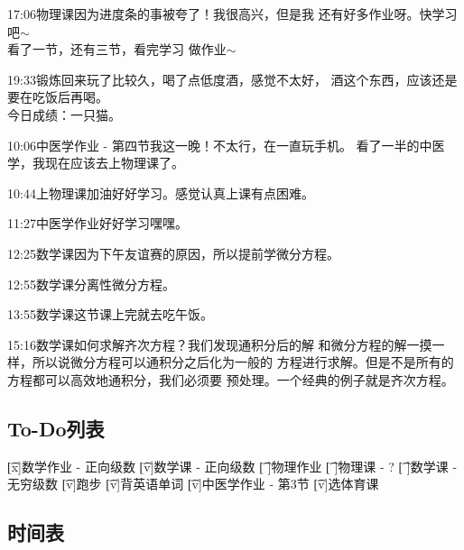 \documentclass{peterlitsdoc}
\begin{document}
\begin{pltplan}
\item[v]{17:06}{物理课}{因为进度条的事被夸了！我很高兴，但是我
    还有好多作业呀。快学习吧$\sim$\\看了一节，还有三节，看完学习
    做作业$\sim$}
\item[v]{19:33}{锻炼}{回来玩了比较久，喝了点低度酒，感觉不太好，
    酒这个东西，应该还是要在吃饭后再喝。\\今日成绩：一只猫。}
\item[x]{10:06}{中医学作业 - 第四节}{我这一晚！不太行，在一直玩手机。
    看了一半的中医学，我现在应该去上物理课了。}
\item[x]{10:44}{上物理课}{加油好好学习。感觉认真上课有点困难。}
\item[v]{11:27}{中医学作业}{好好学习嘿嘿。}
\item[x]{12:25}{数学课}{因为下午友谊赛的原因，所以提前学微分方程。}
\item[x]{12:55}{数学课}{分离性微分方程。}
\item[x]{13:55}{数学课}{这节课上完就去吃午饭。}
\item[x]{15:16}{数学课}{如何求解齐次方程？我们发现通积分后的解
    和微分方程的解一摸一样，所以说微分方程可以通积分之后化为一般的
    方程进行求解。但是不是所有的方程都可以高效地通积分，我们必须要
    预处理。一个经典的例子就是齐次方程。}
\end{pltplan}

\newpage



\subsection{To-Do列表}

\begin{plttodoenv}{4}
    \t[x]数学作业 - 正向级数
    \t[v]数学课 - 正向级数
    \t[ ]物理作业
    \t[ ]物理课 - ?
    \t[ ]数学课 - 无穷级数
    \t[v]跑步
    \t[v]背英语单词
    \t[v]中医学作业 - 第3节
    \t[v]选体育课
\end{plttodoenv}

\subsection{时间表}
\end{document}
